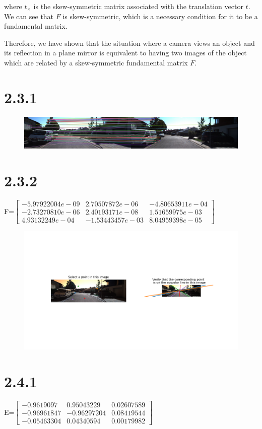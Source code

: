 \documentclass{article}
\begin{document}
    where $t_\times$ is the skew-symmetric matrix associated with the translation vector $t$. We can see that $F$ is skew-symmetric, which is a necessary condition for it to be a fundamental matrix.
    
    Therefore, we have shown that the situation where a camera views an object and its reflection in a plane mirror is equivalent to having two images of the object which are related by a skew-symmetric fundamental matrix $F$.
    \section*{2.3.1}

    \begin{figure}[H]
        \centering
              \includegraphics[width=0.9\linewidth]{../homework/2_3_1_fig1.png}
    \end{figure}
    \section*{2.3.2}

    F=$\begin{bmatrix}
        -5.97922004e-09&2.70507872e-06&-4.80653911e-04\\
        -2.73270810e-06&2.40193171e-08&1.51659975e-03\\
        4.93132249e-04&-1.53443457e-03&8.04959398e-05
    \end{bmatrix}$\\
    \begin{figure}[H]
        \centering
              \includegraphics[width=0.9\linewidth]{../homework/2_3_2_displayEpipolarF.png}
    \end{figure}
    \section*{2.4.1}

    E=$\begin{bmatrix}
        -0.9619097   &0.95043229  &0.02607589\\
        -0.96961847 &-0.96297204  &0.08419544\\
        -0.05463304  &0.04340594  &0.00179982
    \end{bmatrix}$\\
    
\end{document}
